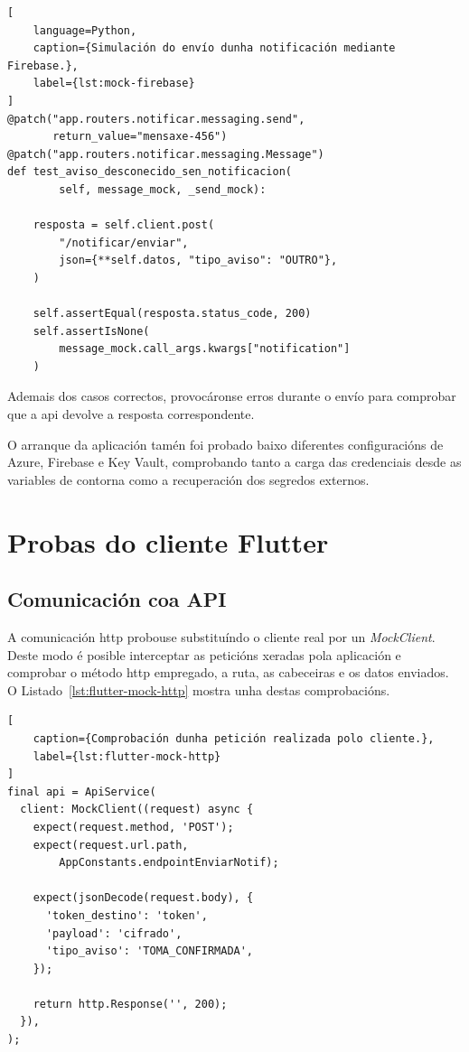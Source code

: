 \begin{lstlisting}[
    language=Python,
    caption={Simulación do envío dunha notificación mediante Firebase.},
    label={lst:mock-firebase}
]
@patch("app.routers.notificar.messaging.send",
       return_value="mensaxe-456")
@patch("app.routers.notificar.messaging.Message")
def test_aviso_desconecido_sen_notificacion(
        self, message_mock, _send_mock):

    resposta = self.client.post(
        "/notificar/enviar",
        json={**self.datos, "tipo_aviso": "OUTRO"},
    )

    self.assertEqual(resposta.status_code, 200)
    self.assertIsNone(
        message_mock.call_args.kwargs["notification"]
    )
\end{lstlisting}

Ademais dos casos correctos, provocáronse erros durante o envío para comprobar que a \gls{api} devolve a resposta correspondente.

O arranque da aplicación tamén foi probado baixo diferentes configuracións de Azure, Firebase e Key Vault, comprobando tanto a carga das credenciais desde as variables de contorna como a recuperación dos segredos externos.


\section{Probas do cliente Flutter}

\subsection{Comunicación coa API}

A comunicación \gls{http} probouse substituíndo o cliente real por un \textit{MockClient}. Deste modo é posible interceptar as peticións xeradas pola aplicación e comprobar o método \gls{http} empregado, a ruta, as cabeceiras e os datos enviados. O Listado~\ref{lst:flutter-mock-http} mostra unha destas comprobacións.

\begin{lstlisting}[
    caption={Comprobación dunha petición realizada polo cliente.},
    label={lst:flutter-mock-http}
]
final api = ApiService(
  client: MockClient((request) async {
    expect(request.method, 'POST');
    expect(request.url.path,
        AppConstants.endpointEnviarNotif);

    expect(jsonDecode(request.body), {
      'token_destino': 'token',
      'payload': 'cifrado',
      'tipo_aviso': 'TOMA_CONFIRMADA',
    });

    return http.Response('', 200);
  }),
);
\end{lstlisting}

